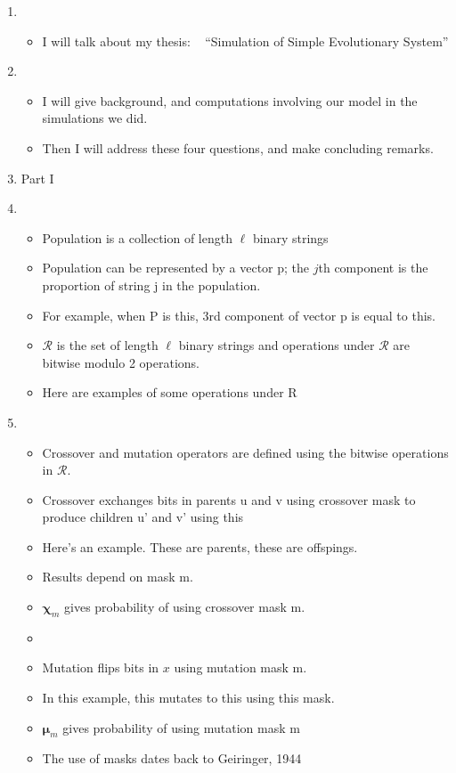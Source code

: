 \documentclass{article}
\begin{document}
\setcounter{page}{1}    
\newlength{\mywidth}
\setlength{\mywidth}{0.9\linewidth}
\newlength{\myheight}
\setlength{\myheight}{0.5in}
    
\begin{enumerate}
\item
  \begin{itemize}
  \item I will talk about my thesis: \hfill\mbox{ }\linebreak
      ``Simulation of Simple Evolutionary System'' 
  \end{itemize}  
    
\item
  \begin{itemize}
  \item      
      I will give background, and computations involving our model in the simulations we did. 
  \item
      Then I will address these four questions, and make
      concluding remarks.    
  \end{itemize}
  
\item Part I
  
\item
  \begin{itemize}
  \item Population is a collection of length $\ell$ binary strings 
  \item Population can be represented by a vector p; the $j$th component
      is the proportion of string j in the population.
  \item For example, when P is this, 3rd component of vector p is equal to this.
    \item $\mathcal{R}$ is the set of length $\ell$ binary strings and operations under $\mathcal{R}$ are bitwise modulo 2 operations.
    \item Here are examples of some operations under R
  \end{itemize}
    
\item
  \begin{itemize}
  \item Crossover and mutation operators are defined using the
    bitwise operations in $\mathcal{R}$.
  \item Crossover exchanges bits in parents u and v using crossover mask
  to produce children u' and v' using this
  \item Here's an example. These are parents, these are offspings.
  \item Results depend on mask m. 
  \item $\bm{\chi}_m$ gives probability of using crossover mask m.
  \item
  \item Mutation flips bits in $x$ using mutation mask m.
  \item In this example, this mutates to this using this mask.
  \item $\bm{\mu}_m$ gives probability of using mutation mask m
  \item The use of masks dates back to Geiringer, 1944
  \end{itemize}
    

\end{enumerate}
\end{document}
